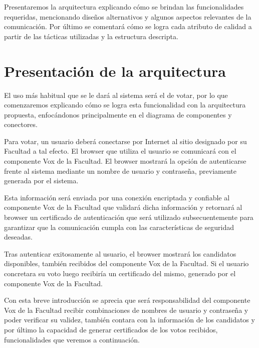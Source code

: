 

Presentaremos la arquitectura explicando cómo se brindan las funcionalidades requeridas, mencionando diseños alternativos y algunos aspectos relevantes de la comunicación. Por último se comentará cómo se logra cada atributo de calidad a partir de las tácticas utilizadas y la estructura descripta. 

\section{Presentación de la arquitectura}

El uso más habitual que se le dará al sistema será el de votar, por lo que comenzaremos explicando cómo se logra esta funcionalidad con la arquitectura propuesta, enfocándonos principalmente en el diagrama de componentes y conectores.

Para votar, un usuario deberá conectarse por Internet al sitio designado por su Facultad a tal efecto. El browser que utiliza el usuario se comunicará con el componente Vox de la Facultad. El browser mostrará la opción de autenticarse frente al sistema mediante un nombre de usuario y contraseña, previamente generada por el sistema.

Esta información será enviada por una conexión encriptada y confiable al componente Vox de la Facultad que validará dicha información y retornará al browser un certificado de autenticación que será utilizado subsecuentemente para garantizar que la comunicación cumpla con las características de seguridad deseadas.

Tras autenticar exitosamente al usuario, el browser mostrará los candidatos disponibles, también recibidos del componente Vox de la Facultad. Si el usuario concretara su voto luego recibiría un certificado del mismo, generado por el componente Vox de la Facultad.

Con esta breve introducción se aprecia que será responsabilidad del componente Vox de la Facultad recibir combinaciones de nombres de usuario y contraseña y poder verificar su validez, también contara con la información de los candidatos y por último la capacidad de generar certificados de los votos recibidos, funcionalidades que veremos a continuación.


